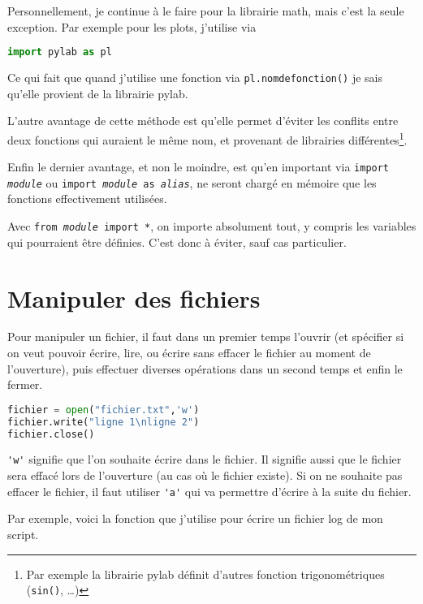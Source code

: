 \documentclass[a4paper,twoside]{article}
\begin{document}
Personnellement, je continue à le faire pour la librairie math, mais c'est la seule exception. Par exemple pour les plots, j'utilise  via
\begin{lstlisting}[language=python]
import pylab as pl
\end{lstlisting}
Ce qui fait que quand j'utilise une fonction via \texttt{pl.nomdefonction()} je sais qu'elle provient de la librairie pylab.

L'autre avantage de cette méthode est qu'elle permet d'éviter les conflits entre deux fonctions qui auraient le même nom, et provenant de librairies différentes\footnote{Par exemple la librairie pylab définit d'autres fonction trigonométriques (\texttt{sin()}, \dots)}.

Enfin le dernier avantage, et non le moindre, est qu'en important via \texttt{import \emph{module}} ou \texttt{import \emph{module} as \emph{alias}}, ne seront chargé en mémoire que les fonctions effectivement utilisées.

\begin{attention}
Avec \texttt{from \emph{module} import *}, on importe absolument tout, y compris les variables qui pourraient être définies. C'est donc à éviter, sauf cas particulier.
\end{attention}





\section{Manipuler des fichiers}
Pour manipuler un fichier, il faut dans un premier temps l'ouvrir (et spécifier si on veut pouvoir écrire, lire, ou écrire sans effacer le fichier au moment de l'ouverture), puis effectuer diverses opérations dans un second temps et enfin le fermer.

\begin{lstlisting}[language=python]
fichier = open("fichier.txt",'w')
fichier.write("ligne 1\nligne 2")
fichier.close()
\end{lstlisting}
\verb|'w'| signifie que l'on souhaite écrire dans le fichier. Il signifie aussi que le fichier sera effacé lors de l'ouverture (au cas où le fichier existe). Si on ne souhaite pas effacer le fichier, il faut utiliser \verb|'a'| qui va permettre d'écrire à la suite du fichier.

Par exemple, voici la fonction que j'utilise pour écrire un fichier log de mon script.
\end{document}
